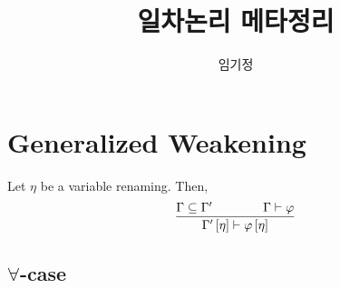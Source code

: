 \documentclass[12pt]{paper}
\title{일차논리 메타정리}
\author{임기정}
\begin{document}
\maketitle

\section{Generalized Weakening}

Let $\eta$ be a variable renaming. Then,
$$\infer{\Gamma^{\prime} \left[ \eta \right] \vdash \varphi \left[ \eta \right]}{\Gamma \subseteq \Gamma^{\prime} & \qquad & \Gamma \vdash \varphi}$$

\subsection[]{$\forall$-case}
\end{document}
